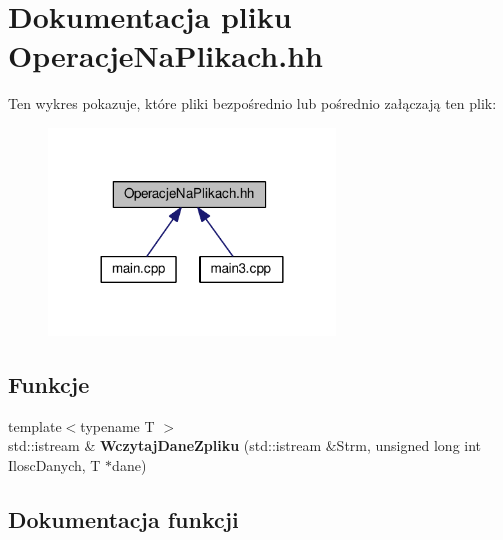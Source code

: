 \section{Dokumentacja pliku Operacje\-Na\-Plikach.\-hh}
\label{_operacje_na_plikach_8hh}
Ten wykres pokazuje, które pliki bezpośrednio lub pośrednio załączają ten plik\-:
\nopagebreak
\begin{figure}[H]
\begin{center}
\leavevmode
\includegraphics[width=216pt]{_operacje_na_plikach_8hh__dep__incl}
\end{center}
\end{figure}
\subsection*{Funkcje}
\begin{DoxyCompactItemize}
\item 
{\footnotesize template$<$typename T $>$ }\\std\-::istream \& {\bf Wczytaj\-Dane\-Zpliku} (std\-::istream \&Strm, unsigned long int Ilosc\-Danych, T $\ast$dane)
\end{DoxyCompactItemize}


\subsection{Dokumentacja funkcji}
